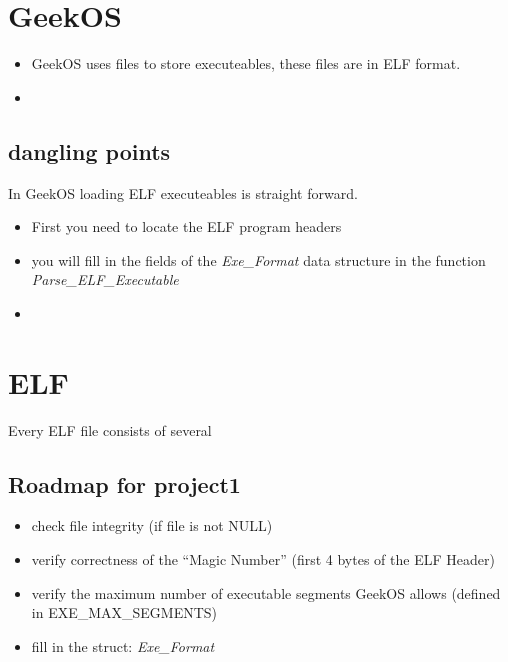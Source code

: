 \section{GeekOS}

\begin{itemize}
  \item GeekOS uses files to store executeables, these files are in ELF format.
  \item 
\end{itemize}

\subsection{dangling points}
In GeekOS loading ELF executeables is straight forward.
\begin{itemize}
  \item First you need to locate the ELF program headers
  \item you will fill in the fields of the \textit{Exe\_Format} data structure in the function \textit{Parse\_ELF\_Executable}
  \item 
\end{itemize}

\section{ELF}
Every ELF file consists of several  








\subsection{Roadmap for project1}
\begin{itemize}
  \item check file integrity (if file is not NULL)
  \item verify correctness of the ``Magic Number'' (first 4 bytes of the ELF Header)%
  \item verify the maximum number of executable segments GeekOS allows  (defined in EXE\_MAX\_SEGMENTS)%
  \item fill in the struct: \textit{Exe\_Format}
\end{itemize}

